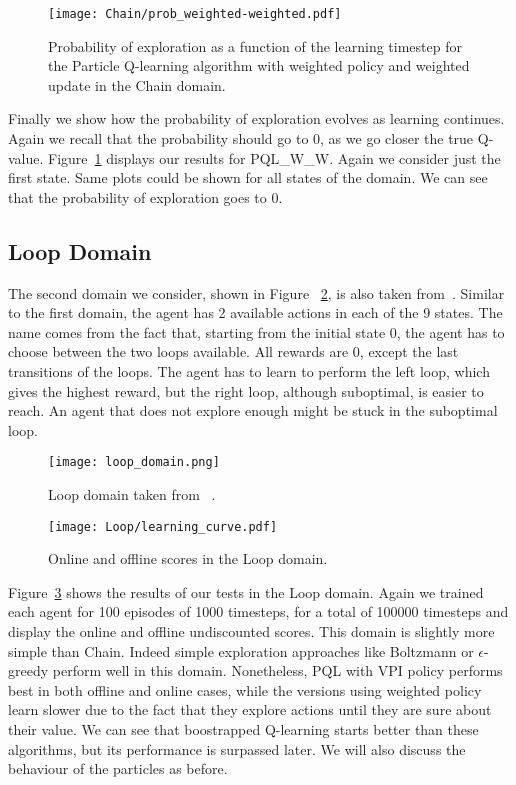 \begin{figure}
  \centering \texttt{[image: Chain/prob\_weighted-weighted.pdf]}
\caption{Probability of exploration as a function of the learning timestep for the Particle Q-learning algorithm with weighted policy and weighted update in the Chain domain.}
\label{fig:chain_prob_evolution}
\end{figure}
Finally we show how the probability of exploration evolves as learning continues. Again we recall that the probability should go to 0, as we go closer the true Q-value. Figure~\ref{fig:chain_prob_evolution} displays our results for PQL\_W\_W. Again we consider just the first state. Same plots could be shown for all states of the domain. We can see that  the probability of exploration goes to 0.

\subsection{Loop Domain}
The second domain we consider, shown in Figure ~\ref{fig:loop_domain}, is also taken from~\cite{Dearden98bayesianq-learning}. Similar to the first domain, the agent has 2 available actions in each of the 9 states. The name comes from the fact that, starting from the initial state 0, the agent has to choose between the two loops available. All rewards are 0, except the last transitions of the loops. The agent has to learn to perform the left loop, which gives the highest reward, but the right loop, although suboptimal, is easier to reach. An agent that does not explore enough might be stuck in the suboptimal loop.\par
\begin{figure}
 \texttt{[image: loop\_domain.png]}
 \caption{Loop domain taken from ~\cite{Dearden98bayesianq-learning}.} 
 \label{fig:loop_domain}
\end{figure}
\begin{figure}
 \texttt{[image: Loop/learning\_curve.pdf]}
 \caption{Online and offline scores in the Loop domain.}
 \label{fig:loop_learning_curve}
\end{figure}
Figure~\ref{fig:loop_learning_curve} shows the results of our tests in the Loop domain. Again we trained each agent for 100 episodes of 1000 timesteps, for a total of 100000 timesteps and display the online and offline undiscounted scores. This domain is slightly more simple than Chain. Indeed simple exploration approaches like Boltzmann or $\epsilon$-greedy perform well in this domain. Nonetheless, PQL with VPI policy performs best in both offline and online cases, while the versions using weighted policy learn slower due to the fact that they explore actions until they are sure about their value. We can see that boostrapped Q-learning starts better than these algorithms, but its performance is surpassed later. We will also discuss the behaviour of the particles as before. \par
